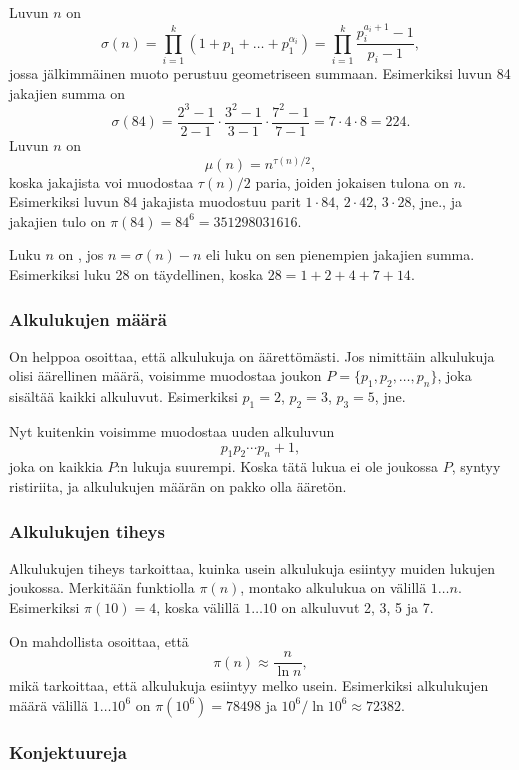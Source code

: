 Luvun $n$  on
\[\sigma(n)=\prod_{i=1}^k (1+p_1+\ldots+p_1^{\alpha_i}) = \prod_{i=1}^k \frac{p_i^{a_i+1}-1}{p_i-1},\]
jossa jälkimmäinen muoto perustuu geometriseen summaan.
Esimerkiksi luvun 84 jakajien summa on
\[\sigma(84)=\frac{2^3-1}{2-1} \cdot \frac{3^2-1}{3-1} \cdot \frac{7^2-1}{7-1} = 7 \cdot 4 \cdot 8 = 224.\]
Luvun $n$  on
\[\mu(n)=n^{\tau(n)/2},\]
koska jakajista voi muodostaa
$\tau(n)/2$ paria, joiden jokaisen tulona on $n$.
Esimerkiksi luvun 84 jakajista muodostuu parit
$1 \cdot 84$, $2 \cdot 42$, $3 \cdot 28$, jne.,
ja jakajien tulo on $\pi(84)=84^6=351298031616$.


Luku $n$ on , jos $n=\sigma(n)-n$
eli luku on sen pienempien jakajien summa.
Esimerkiksi luku 28 on täydellinen,
koska $28 = 1+2+4+7+14$.

\subsubsection{Alkulukujen määrä}

On helppoa osoittaa, että alkulukuja on äärettömästi.
Jos nimittäin alkulukuja olisi äärellinen määrä,
voisimme muodostaa joukon $P=\{p_1,p_2,\ldots,p_n\}$,
joka sisältää kaikki alkuluvut.
Esimerkiksi $p_1=2$, $p_2=3$, $p_3=5$, jne.

Nyt kuitenkin voisimme muodostaa uuden alkuluvun
\[p_1 p_2 \cdots p_n+1,\]
joka on kaikkia $P$:n lukuja suurempi.
Koska tätä lukua ei ole joukossa $P$,
syntyy ristiriita, ja alkulukujen määrän on
pakko olla ääretön.

\subsubsection{Alkulukujen tiheys}

Alkulukujen tiheys tarkoittaa, kuinka usein alkulukuja
esiintyy muiden lukujen joukossa.
Merkitään funktiolla $\pi(n)$, 
montako alkulukua on välillä $1 \ldots n$.
Esimerkiksi $\pi(10)=4$, koska välillä $1 \ldots 10$
on alkuluvut 2, 3, 5 ja 7.

On mahdollista osoittaa, että
\[\pi(n) \approx \frac{n}{\ln n},\]
mikä tarkoittaa, että alkulukuja esiintyy
melko usein. Esimerkiksi alkulukujen määrä
välillä $1 \ldots 10^6$ on $\pi(10^6)=78498$
ja $10^6 / \ln 10^6 \approx 72382$.

\subsubsection{Konjektuureja}

